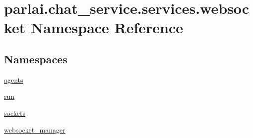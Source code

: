 \hypertarget{namespaceparlai_1_1chat__service_1_1services_1_1websocket}{}\section{parlai.\+chat\+\_\+service.\+services.\+websocket Namespace Reference}
\label{namespaceparlai_1_1chat__service_1_1services_1_1websocket}
\subsection*{Namespaces}
\begin{DoxyCompactItemize}
\item 
 \hyperlink{namespaceparlai_1_1chat__service_1_1services_1_1websocket_1_1agents}{agents}
\item 
 \hyperlink{namespaceparlai_1_1chat__service_1_1services_1_1websocket_1_1run}{run}
\item 
 \hyperlink{namespaceparlai_1_1chat__service_1_1services_1_1websocket_1_1sockets}{sockets}
\item 
 \hyperlink{namespaceparlai_1_1chat__service_1_1services_1_1websocket_1_1websocket__manager}{websocket\+\_\+manager}
\end{DoxyCompactItemize}
